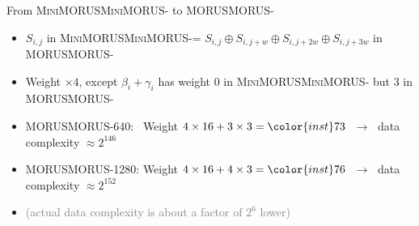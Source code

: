 \documentclass[aspectratio=169,table]{beamer}
\renewcommand{\emph}[1]{{\color{inst}#1}}
\newcommand{\sn}[1]{\textcolor{gray}{\small #1}}
\newcommand{\cipher}[1]{\textsc{#1}}
\newcommand{\MORUS}[1][]{\ifx\relax#1\relax\cipher{MORUS}\else\cipher{MORUS-#1}\fi\xspace}
\newcommand{\MiniMORUS}[1][]{\ifx\relax#1\relax\cipher{MiniMORUS}\else\cipher{MiniMORUS-#1}\fi\xspace}
\begin{document}
\begin{frame}{From \MiniMORUS to \MORUS}%
  \begin{itemize}
    \item
         \structure{=}
         \structure{+}
         \structure{+}
         \structure{+}

      $S_{i,j}$ in \MiniMORUS = $S_{i,j} \oplus S_{i,j + w} \oplus S_{i,j + 2w} \oplus S_{i,j + 3w}$ in \MORUS
      \bigskip
    \item Weight $\times 4$\pause, except $\beta_i + \gamma_i$ has weight 0 in \MiniMORUS but 3 in \MORUS
      \bigskip
    \item[\faArrowCircleRight] \MORUS[640]:~ Weight $4 \times 16 + 3 \times 3 = \emph{73}$
      $\;\to\;$ data complexity $\approx 2^{146}$ \hfill\faFrownO
    \item[\faArrowCircleRight] \MORUS[1280]: Weight $4 \times 16 + 4 \times 3 = \emph{76}$
      $\;\to\;$ data complexity $\approx 2^{152}$ \hfill{}%
      \bigskip
    \item \sn{(actual data complexity is about a factor of $2^6$ lower)}
  \end{itemize}
\end{frame}%
\end{document}
